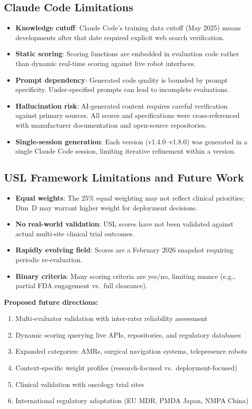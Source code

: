 \documentclass[11pt,a4paper]{article}
\begin{document}
\subsection{Claude Code Limitations}
\begin{itemize}
  \item \textbf{Knowledge cutoff}: Claude Code's training data cutoff (May 2025) means developments after that date required explicit web search verification.
  \item \textbf{Static scoring}: Scoring functions are embedded in evaluation code rather than dynamic real-time scoring against live robot interfaces.
  \item \textbf{Prompt dependency}: Generated code quality is bounded by prompt specificity. Under-specified prompts can lead to incomplete evaluations.
  \item \textbf{Hallucination risk}: AI-generated content requires careful verification against primary sources. All scores and specifications were cross-referenced with manufacturer documentation and open-source repositories.
  \item \textbf{Single-session generation}: Each version (v1.4.0--v1.8.0) was generated in a single Claude Code session, limiting iterative refinement within a version.
\end{itemize}

\subsection{USL Framework Limitations and Future Work}
\begin{itemize}
  \item \textbf{Equal weights}: The 25\% equal weighting may not reflect clinical priorities; Dim~D may warrant higher weight for deployment decisions.
  \item \textbf{No real-world validation}: USL scores have not been validated against actual multi-site clinical trial outcomes.
  \item \textbf{Rapidly evolving field}: Scores are a February 2026 snapshot requiring periodic re-evaluation.
  \item \textbf{Binary criteria}: Many scoring criteria are yes/no, limiting nuance (e.g., partial FDA engagement vs.\ full clearance).
\end{itemize}

\textbf{Proposed future directions:}
\begin{enumerate}
  \item Multi-evaluator validation with inter-rater reliability assessment
  \item Dynamic scoring querying live APIs, repositories, and regulatory databases
  \item Expanded categories: AMRs, surgical navigation systems, telepresence robots
  \item Context-specific weight profiles (research-focused vs.\ deployment-focused)
  \item Clinical validation with oncology trial sites
  \item International regulatory adaptation (EU MDR, PMDA Japan, NMPA China)
\end{enumerate}
\end{document}
